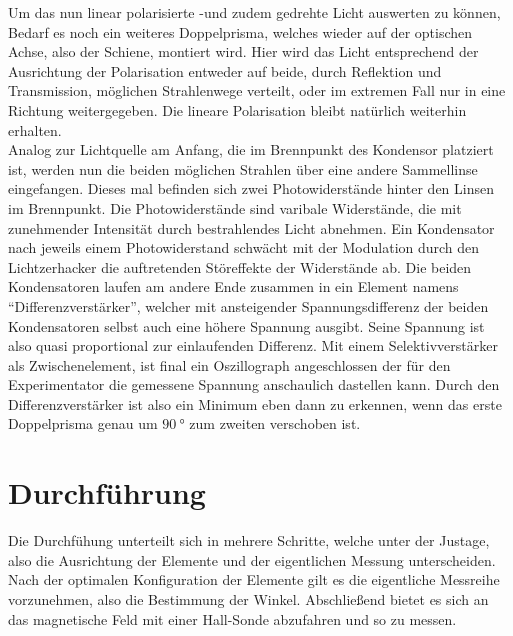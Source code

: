 \newline
Um das nun linear polarisierte -und zudem gedrehte Licht auswerten zu können, Bedarf es noch ein weiteres Doppelprisma, welches wieder auf der optischen Achse, also der Schiene,
montiert wird. Hier wird das Licht entsprechend der Ausrichtung der Polarisation entweder auf beide, durch Reflektion und Transmission,
möglichen Strahlenwege verteilt, oder im extremen Fall nur in eine Richtung weitergegeben. Die lineare Polarisation bleibt natürlich weiterhin erhalten.
\\
\newline
Analog zur Lichtquelle am Anfang, die im Brennpunkt des Kondensor platziert ist, werden nun die beiden möglichen Strahlen
über eine andere Sammellinse eingefangen. Dieses mal befinden sich zwei Photowiderstände hinter den Linsen im Brennpunkt.
Die Photowiderstände sind varibale Widerstände, die mit zunehmender Intensität durch bestrahlendes Licht abnehmen.
Ein Kondensator nach jeweils einem Photowiderstand schwächt mit der Modulation durch den Lichtzerhacker die auftretenden Störeffekte 
der Widerstände ab. Die beiden Kondensatoren laufen am andere Ende zusammen in ein Element namens \enquote{Differenzverstärker},
welcher mit ansteigender Spannungsdifferenz der beiden Kondensatoren selbst auch eine höhere Spannung ausgibt. Seine Spannung ist also 
quasi proportional zur einlaufenden Differenz. Mit einem Selektivverstärker als Zwischenelement, ist final ein Oszillograph angeschlossen
der für den Experimentator die gemessene Spannung anschaulich dastellen kann. Durch den Differenzverstärker ist also ein Minimum eben dann zu erkennen, wenn das erste 
Doppelprisma genau um $\SI{90}{\degree}$ zum zweiten verschoben ist.



\section{Durchführung}
Die Durchfühung unterteilt sich in mehrere Schritte, welche unter der Justage, also die Ausrichtung der Elemente
und der eigentlichen Messung unterscheiden. Nach der optimalen Konfiguration der Elemente 
gilt es die eigentliche Messreihe vorzunehmen, also die Bestimmung der Winkel. Abschließend 
bietet es sich an das magnetische Feld mit einer Hall-Sonde abzufahren und so zu messen.

